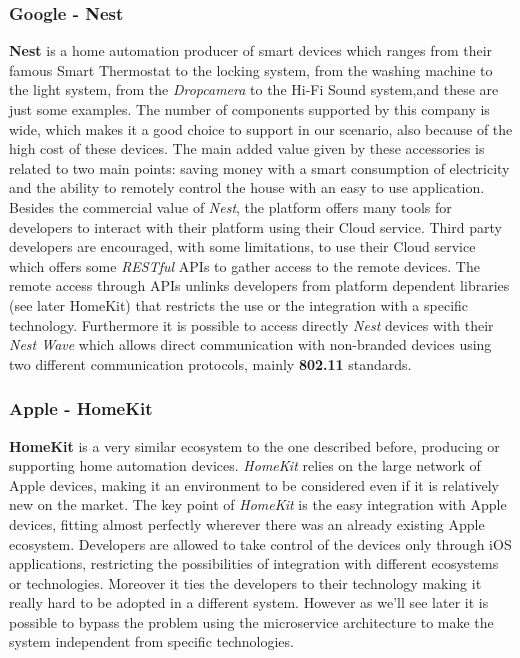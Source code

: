 \subsubsection{Google - Nest}

\textbf{Nest} is a home automation producer of smart devices
which ranges from their famous Smart Thermostat to the locking system, from the
washing machine to the light system, from the \textit{Dropcamera} to the Hi-Fi Sound system,and
these are just some examples. The number of components supported by this company
is wide, which makes it a good choice to support in our scenario, also because of
the high cost of these devices. The main added value given by these accessories is related
to two main points: saving money with a smart consumption of electricity and the ability
to remotely control the house with an easy to use application.
Besides the commercial value of \textit{Nest}, the platform offers many tools for developers
to interact with their platform using their Cloud service. Third party developers
are encouraged, with some limitations, to use their Cloud service which
offers some \textit{RESTful} APIs to gather access to the remote devices.
The remote access through APIs unlinks developers from platform dependent libraries (see later HomeKit)
that restricts the use or the integration with a specific technology.
Furthermore it is possible to access directly \textit{Nest} devices with their \textit{Nest Wave}
which allows direct communication with non-branded devices using two different communication protocols,
mainly \textbf{802.11} standards.


\subsubsection{Apple - HomeKit}

\textbf{HomeKit} is a very similar ecosystem to the one described before, producing or supporting
home automation devices. \textit{HomeKit} relies on the large network of Apple devices,
making it an environment to be considered even if it is relatively new on the market. The key
point of \textit{HomeKit} is the easy integration with Apple devices, fitting almost perfectly wherever
there was an already existing Apple ecosystem. Developers are allowed to take control of the devices
only through iOS applications, restricting the possibilities of integration with different ecosystems or
technologies. Moreover it ties the developers to their technology making it really hard to be adopted in a different
system. However as we'll see later it is possible to bypass the problem using the microservice architecture to
make the system independent from specific technologies.



